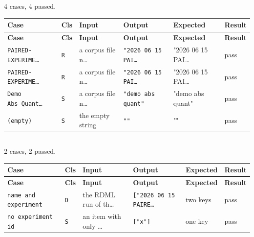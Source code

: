 \subsection*{}
{\small 4 cases, 4 passed.}\par
{\small
\begin{xltabular}{\linewidth}{|X|l|l|l|l|l|}
\toprule \textbf{Case} & \textbf{Cls} & \textbf{Input} & \textbf{Output} & \textbf{Expected} & \textbf{Result} \\\midrule\endfirsthead
\toprule \textbf{Case} & \textbf{Cls} & \textbf{Input} & \textbf{Output} & \textbf{Expected} & \textbf{Result} \\\midrule\endhead
\texttt{PAIRED-EXPERIME…} & \texttt{R} & a corpus file n… & \texttt{"2026 06 15 PAI…} & "2026 06 15 PAI… & pass \\
\texttt{PAIRED-EXPERIME…} & \texttt{R} & a corpus file n… & \texttt{"2026 06 15 PAI…} & "2026 06 15 PAI… & pass \\
\texttt{Demo  Abs\_Quant…} & \texttt{S} & a corpus file n… & \texttt{"demo abs quant"} & "demo abs quant" & pass \\
\texttt{(empty)} & \texttt{S} & the empty string & \texttt{""} & "" & pass \\
\bottomrule
\end{xltabular}}

\subsection*{}
{\small 2 cases, 2 passed.}\par
{\small
\begin{xltabular}{\linewidth}{|X|l|l|l|l|l|}
\toprule \textbf{Case} & \textbf{Cls} & \textbf{Input} & \textbf{Output} & \textbf{Expected} & \textbf{Result} \\\midrule\endfirsthead
\toprule \textbf{Case} & \textbf{Cls} & \textbf{Input} & \textbf{Output} & \textbf{Expected} & \textbf{Result} \\\midrule\endhead
\texttt{name and experiment} & \texttt{D} & the RDML run of th… & \texttt{["2026 06 15 PAIRE…} & two keys & pass \\
\texttt{no experiment id} & \texttt{S} & an item with only … & \texttt{["x"]} & one key & pass \\
\bottomrule
\end{xltabular}}


